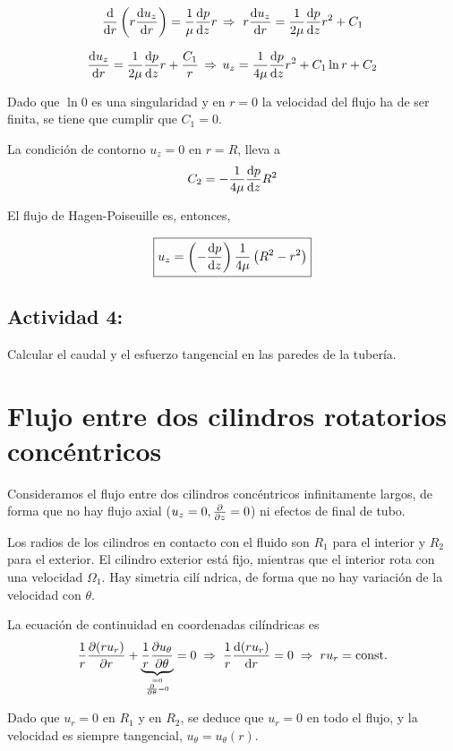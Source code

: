 	\[
	\frac{\textrm{d} }{\textrm{d} r}\left(r\frac{\textrm{d} u_{z}}{\textrm{d} r}\right)=\frac{1}{\mu}\frac{\textrm{d} p}{\textrm{d} z}r\,\Rightarrow\,\,r\frac{\textrm{d} u_{z}}{\textrm{d} r}=\frac{1}{2\mu}\frac{\textrm{d} p}{\textrm{d} z}r^{2}+C_{1}
	\]
	
	\[
	\frac{\textrm{d} u_{z}}{\textrm{d} r}=\frac{1}{2\mu}\frac{\textrm{d} p}{\textrm{d} z}r+\frac{C_{1}}{r}\,\Rightarrow\,u_{z}=\frac{1}{4\mu}\frac{\textrm{d} p}{\textrm{d} z}r^{2}+C_{1}\ln r+C_{2}
	\]
	
	Dado que $\ln0$ es una singularidad y en $r=0$ la velocidad del
	flujo ha de ser finita, se tiene que cumplir que $C_{1}=0$.
	
	La condición de contorno $u_{z}=0$ en $r=R$, lleva a 
	\[
	C_{2}=-\frac{1}{4\mu}\frac{\textrm{d} p}{\textrm{d} z}R^{2}
	\]
	
	El flujo de Hagen-Poiseuille es, entonces, 
	
\begin{equation}
		\boxed{u_{z}=\left(-\frac{\textrm{d} p}{\textrm{d} z}\right)\frac{1}{4\mu}\left(R^{2}-r^{2}\right)}
\end{equation}
	
	
	\subsection*{Actividad 4:}
		Calcular el caudal y el esfuerzo tangencial en las paredes de la
		tubería.

\section{Flujo entre dos cilindros rotatorios concéntricos}
	
	Consideramos el flujo entre dos cilindros concéntricos infinitamente
	largos, de forma que no hay flujo axial ($u_{z}=0,\frac{\partial }{\partial z}=0$)
	ni efectos de final de tubo.
	
	Los radios de los cilindros en contacto con el fluido son $R_{1}$
	para el interior y $R_{2}$ para el exterior. El cilindro exterior
	está fijo, mientras que el interior rota con una velocidad $\Omega_{1}$.
	Hay simetria cilí ndrica, de forma que no hay variación de la velocidad
	con $\theta$.
	
	La ecuación de continuidad en coordenadas cilíndricas es 
	\[
	\frac{1}{r}\dparc{(ru_{r})}{r}+\underbrace{\frac{1}{r}\dparc{u_{\theta}}{\theta}}_{\binom{=0}{\dparc{}{\theta}=0}}=0\;\Rightarrow\;\frac{1}{r}\deriv{(ru_{r})}{r}=0\;\Rightarrow\;ru_{r}=\text{const.}
	\]
	
	
	Dado que $u_{r}=0$ en $R_{1}$ y en $R_{2}$, se deduce que $u_{r}=0$
	en todo el flujo, y la velocidad es siempre tangencial, $u_{\theta}=u_{\theta}(r)$.
	

